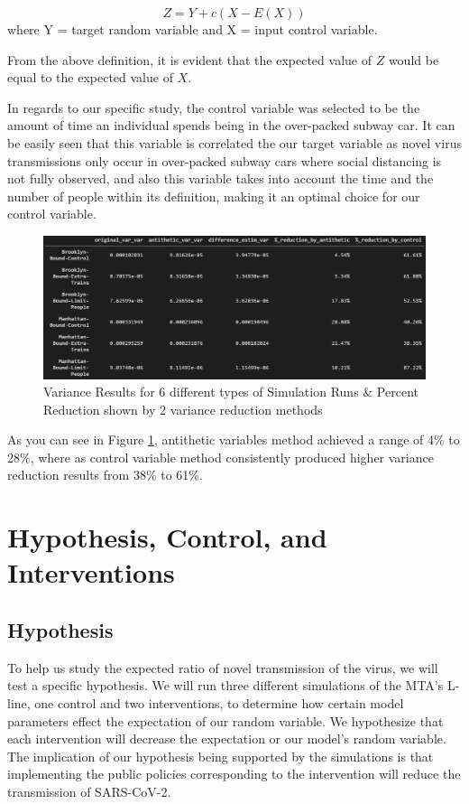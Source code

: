 \documentclass[12pt]{article}
\begin{document}
$$ Z = Y + c(X - E(X)) $$
where Y = target random variable and X = input control variable.

From the above definition, it is evident that the expected value of $Z$ would be equal to the expected value of $X$.

In regards to our specific study, the control variable was selected to be the amount of time an individual spends being in the over-packed subway car. It can be easily seen that this variable is correlated the our target variable as novel virus transmissions only occur in over-packed subway cars where social distancing is not fully observed, and also this variable takes into account the time and the number of people within its definition, making it an optimal choice for our control variable.

\begin{figure}[h]
	\centering
	\includegraphics[scale=.42]{./figures/var-red-results.png}
	\caption{Variance Results for 6 different types of Simulation Runs \& Percent Reduction shown by 2 variance reduction methods}
	\label{var-red-results}
\end{figure}

As you can see in Figure \ref{var-red-results}, antithetic variables method achieved a range of 4\% to 28\%, where as control variable method consistently produced higher variance reduction results from 38\% to 61\%.

\section{Hypothesis, Control, and Interventions}

\subsection{Hypothesis}

To help us study the expected ratio of novel transmission of the virus, we will test a specific hypothesis.
We will run three different simulations of the MTA's L-line, one control and two interventions, to determine how certain model parameters effect the expectation of our random variable.
We hypothesize that each intervention will decrease the expectation or our model's random variable.
The implication of our hypothesis being supported by the simulations is that implementing the public policies corresponding to the intervention will reduce the transmission of SARS-CoV-2.
\end{document}
